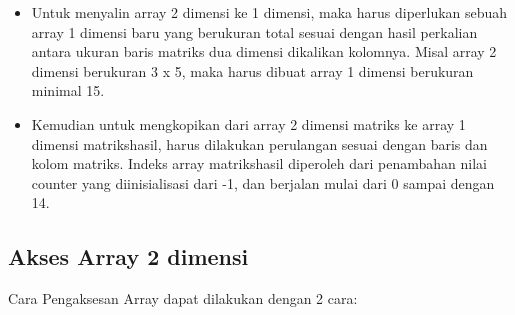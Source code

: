 \begin{itemize}

\item
 Untuk menyalin array 2 dimensi ke 1 dimensi, maka harus diperlukan
 sebuah array 1 dimensi baru yang berukuran total sesuai dengan hasil
 perkalian antara ukuran baris matriks dua dimensi dikalikan kolomnya.
 Misal array 2 dimensi berukuran 3 x 5, maka harus dibuat array 1
 dimensi berukuran minimal 15.
\item
 Kemudian untuk mengkopikan dari array 2 dimensi matriks ke array 1
 dimensi matrikshasil, harus dilakukan perulangan sesuai dengan baris
 dan kolom matriks. Indeks array matrikshasil diperoleh dari penambahan
 nilai counter yang diinisialisasi dari -1, dan berjalan mulai dari 0
 sampai dengan 14.
\end{itemize}

\subsection{Akses Array 2 dimensi}

Cara Pengaksesan Array dapat dilakukan dengan 2 cara:

